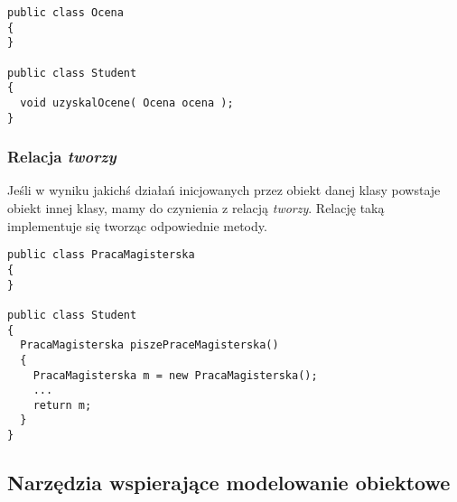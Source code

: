 \begin{scriptsize}
\begin{verbatim}
public class Ocena
{
}

public class Student
{
  void uzyskalOcene( Ocena ocena );
}
\end{verbatim}
\end{scriptsize}

\subsubsection{Relacja {\em tworzy}}

Jeśli w wyniku jakichś działań inicjowanych przez obiekt danej klasy powstaje obiekt innej klasy, mamy do
czynienia z relacją {\em tworzy}. Relację taką implementuje się tworząc odpowiednie metody.

\begin{scriptsize}
\begin{verbatim}
public class PracaMagisterska
{
}

public class Student
{
  PracaMagisterska piszePraceMagisterska()
  {
    PracaMagisterska m = new PracaMagisterska();
    ...
    return m;
  }
}
\end{verbatim}
\end{scriptsize}

\subsection{Narzędzia wspierające modelowanie obiektowe}

